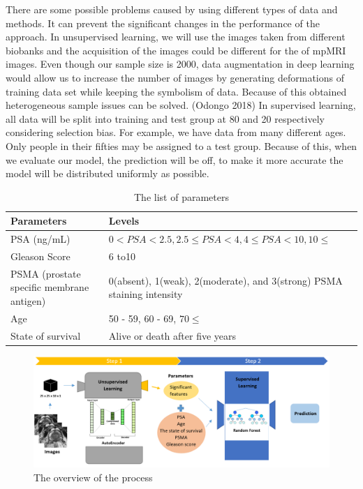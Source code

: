 \documentclass[11pt]{article}
\begin{document}
There are some possible problems caused by using different types of data and methods. It can prevent the significant changes in the performance of the approach. In unsupervised learning, we will use the images taken from different biobanks and the acquisition of the images could be different for the of mpMRI images. Even though our sample size is 2000, data augmentation in deep learning would allow us to increase the number of images by generating deformations of training data set while keeping the symbolism of data. Because of this obtained heterogeneous sample issues can be solved. (Odongo  2018) In supervised learning, all data will be split into training and test group at 80 and 20 respectively considering selection bias. For example, we have data from many different ages. Only people in their fifties may be assigned to a test group. Because of this, when we evaluate our model, the prediction will be off, to make it more accurate the model will be distributed uniformly as possible. 
\begin{table}[H]
\begin{center}
\begin{tabular}{ |p{4cm}|p{9cm}|   } 
\hline
{\bf Parameters} & {\bf Levels}  \\ 
\hline
PSA (ng/mL) & $ 0 < PSA < 2.5, 2.5 \leq PSA < 4, 4 \leq PSA < 10, 10 \leq $ \\ 
\hline
Gleason Score & 6 to10  \\ 
\hline
 PSMA \scriptsize (prostate specific membrane antigen) & 0(absent), 1(weak), 2(moderate), and 3(strong) PSMA staining intensity \\
\hline
Age & 50 - 59, 60 - 69, $70 \leq $  \\ 
\hline
State of survival & Alive or death after five years  \\ 
\hline
\end{tabular}
\caption{The list of parameters}
\end{center}
\end{table}
\begin{figure}[H]
\centering
\includegraphics[width=0.98\linewidth]{Fig2_Overview_of_the_process.png} 
\vspace{-3mm}
\caption{\footnotesize The overview of the process
}
\label{fig:Fig2}
\end{figure}
\end{document}

